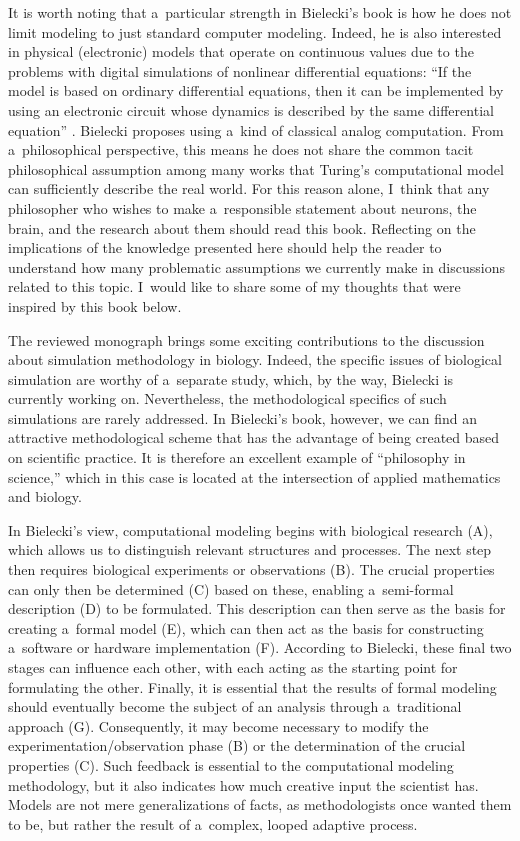 It is worth noting that a~particular strength in Bielecki's book is how he does not limit modeling to just standard computer modeling. Indeed, he is also interested in physical (electronic) models that operate on continuous values due to the problems with digital simulations of nonlinear differential equations: ``If the model is based on ordinary differential equations, then it can be implemented by using an electronic circuit whose dynamics is described by the same differential equation''
\parencite[][p.17]{bielecki_models_2019}. %
 Bielecki proposes using a~kind of classical analog computation. From a~philosophical perspective, this means he does not share the common tacit philosophical assumption among many works that Turing's computational model can sufficiently describe the real world. For this reason alone, I~think that any philosopher who wishes to make a~responsible statement about neurons, the brain, and the research about them should read this book. Reflecting on the implications of the knowledge presented here should help the reader to understand how many problematic assumptions we currently make in discussions related to this topic. I~would like to share some of my thoughts that were inspired by this book below.

The reviewed monograph brings some exciting contributions to the discussion about simulation methodology in biology. Indeed, the specific issues of biological simulation are worthy of a~separate study, which, by the way, Bielecki is currently working on. Nevertheless, the methodological specifics of such simulations are rarely addressed. In Bielecki's book, however, we can find an attractive methodological scheme that has the advantage of being created based on scientific practice. It is therefore an excellent example of ``philosophy in science,'' which in this case is located at the intersection of applied mathematics and biology.

In Bielecki's view, computational modeling begins with biological research (A), which allows us to distinguish relevant structures and processes. The next step then requires biological experiments or observations (B). The crucial properties can only then be determined (C) based on these, enabling a~semi-formal description (D) to be formulated. This description can then serve as the basis for creating a~formal model (E), which can then act as the basis for constructing a~software or hardware implementation (F). According to Bielecki, these final two stages can influence each other, with each acting as the starting point for formulating the other. Finally, it is essential that the results of formal modeling should eventually become the subject of an analysis through a~traditional approach (G). Consequently, it may become necessary to modify the experimentation/observation phase (B) or the determination of the crucial properties (C). Such feedback is essential to the computational modeling methodology, but it also indicates how much creative input the scientist has. Models are not mere generalizations of facts, as methodologists once wanted them to be, but rather the result of a~complex, looped adaptive process.

